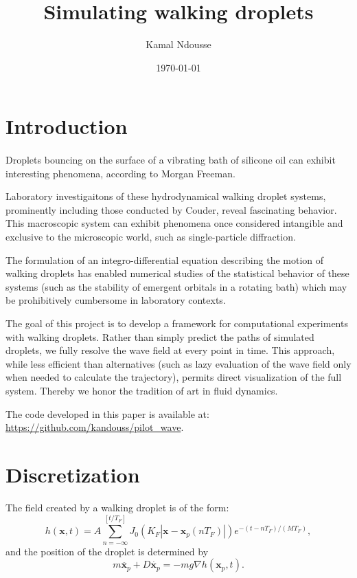 \documentclass{article}
\newcommand{\x}{\mathbf{x}}
\begin{document}
\title{Simulating walking droplets}
\author{Kamal Ndousse}
\date{\today}

\maketitle

\section{Introduction}


\paragraph{}Droplets bouncing on the surface of a vibrating bath of silicone oil can exhibit interesting phenomena, according to Morgan Freeman\cite{morganfreeman}.

Laboratory investigaitons of these hydrodynamical walking droplet systems, prominently including those conducted by Couder, reveal fascinating behavior. This macroscopic system can exhibit phenomena once considered intangible and exclusive to the microscopic world, such as single-particle diffraction\cite{couder}.

The formulation of an integro-differential equation describing the motion of walking droplets has enabled numerical studies of the statistical behavior of these systems (such as the stability of emergent orbitals in a rotating bath\cite{ozanumerics}) which may be prohibitively cumbersome in laboratory contexts.

The goal of this project is to develop a framework for computational experiments with walking droplets. Rather than simply predict the paths of simulated droplets, we fully resolve the wave field at every point in time. This approach, while less efficient than alternatives (such as lazy evaluation of the wave field only when needed to calculate the trajectory), permits direct visualization of the full system. Thereby we honor the tradition of art in fluid dynamics.

The code developed in this paper is available at: \url{https://github.com/kandouss/pilot_wave}.

\section{Discretization}
The field created by a walking droplet is of the form\cite{bushreview}:
\begin{equation}
	\label{eq:raw_field}
	h(\x,t) = A \sum_{n = -\infty}^{\left[ t/T_{F} \right]} J_{0} \left( K_{F} \left| \x - \x_{p}(n T_{F}) \right| \right) e^{-(t - n T_{F})/(M T_{F})},
\end{equation}
and the position of the droplet is determined by
\begin{equation}
	\label{eq:raw_droplet}
	m \ddot{\x_p} + D \dot{\x_p} = - m g \nabla h(\x_p,t).
\end{equation}
\end{document}
